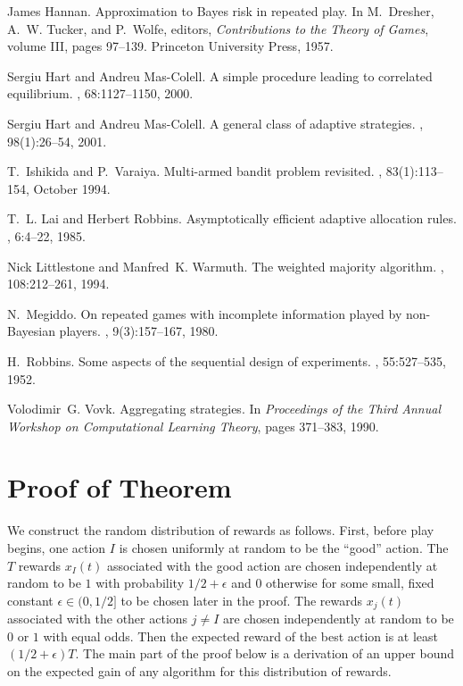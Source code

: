 \documentclass[12pt]{article}
\newcommand{\x}[2]{x_{#1}({#2})}
\newcommand{\gooda}{{I}}
\begin{document}
\begin{thebibliography}{10}
James Hannan.
\newblock Approximation to {B}ayes risk in repeated play.
\newblock In M.~Dresher, A.~W. Tucker, and P.~Wolfe, editors, {\em
  Contributions to the Theory of Games}, volume III, pages 97--139. Princeton
  University Press, 1957.

Sergiu Hart and Andreu Mas-Colell.
\newblock A simple procedure leading to correlated equilibrium.
, 68:1127--1150, 2000.

Sergiu Hart and Andreu Mas-Colell.
\newblock A general class of adaptive strategies.
, 98(1):26--54, 2001.

T.~Ishikida and P.~Varaiya.
\newblock Multi-armed bandit problem revisited.
,
  83(1):113--154, October 1994.

T.~L. Lai and Herbert Robbins.
\newblock Asymptotically efficient adaptive allocation rules.
, 6:4--22, 1985.

Nick Littlestone and Manfred~K. Warmuth.
\newblock The weighted majority algorithm.
, 108:212--261, 1994.

N.~Megiddo.
\newblock On repeated games with incomplete information played by
  non-{Bayesian} players.
, 9(3):157--167, 1980.

H.~Robbins.
\newblock Some aspects of the sequential design of experiments.
, 55:527--535, 1952.

Volodimir~G. Vovk.
\newblock Aggregating strategies.
\newblock In {\em Proceedings of the Third Annual Workshop on Computational
  Learning Theory}, pages 371--383, 1990.

\end{thebibliography}

\appendix

\section{Proof of Theorem~\protect{\ref{thm:lower-bound}}}
\label{sec:lowerproof}
We construct the random distribution of rewards as follows.
First, before play begins,
one action $\gooda$ is chosen uniformly at random to be the
``good'' action.
The $T$ rewards $\x{\gooda}{t}$ associated with the good action are chosen independently
at random to be $1$ with probability $1/2+\epsilon$ and $0$
otherwise for some small, fixed constant $\epsilon\in (0,1/2]$ to be
chosen later in the proof.
The rewards $\x{j}{t}$
associated with the other actions $j\neq\gooda$ are chosen
independently at random
to be $0$ or $1$ with equal odds.
Then the expected reward of the best action is at least
$(1/2+\epsilon){T}$.
The main part of the proof below is a derivation of an upper bound on
the expected gain of any algorithm for this distribution of rewards.
\end{document}
